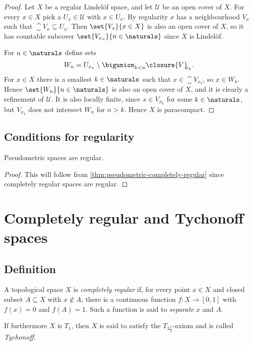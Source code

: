 \documentclass[article, a4paper, 11pt, oneside]{memoir}
\numberwithin{equation}{chapter}
\newcommand{\calU}{\mathcal{U}}
\begin{document}
\begin{proof}
    Let $X$ be a regular Lindelöf space, and let $\calU$ be an open cover of $X$. For every $x \in X$ pick a $U_x \in \calU$ with $x \in U_x$. By regularity $x$ has a neighbourhood $V_x$ such that $\closure{V}_{\!\!x} \subseteq U_x$. Then $\set{V_x}{x \in X}$ is also an open cover of $X$, so it has countable subcover $\set{V_{x_n}}{n \in \naturals}$ since $X$ is Lindelöf.

    For $n \in \naturals$ define sets
    \begin{equation*}
        W_n = U_{x_n} \setminus \bigunion_{k < n} \closure{V}_{\!\!x_k}.
    \end{equation*}
    For $x \in X$ there is a smallest $k \in \naturals$ such that $x \in \closure{V}_{\!\!x_k}$, so $x \in W_k$. Hence $\set{W_n}{n \in \naturals}$ is also an open cover of $X$, and it is clearly a refinement of $\calU$. It is also locally finite, since $x \in V_{x_k}$ for some $k \in \naturals$, but $V_{x_k}$ does not intersect $W_n$ for $n > k$. Hence $X$ is paracompact.
\end{proof}


\section{Conditions for regularity}

\begin{corollary}
    Pseudometric spaces are regular.
\end{corollary}

\begin{proof}
    This will follow from \cref{thm:pseudometric-completely-regular} since completely regular spaces are regular.
\end{proof}



\chapter{Completely regular and Tychonoff spaces}

\section{Definition}

\begin{definition}
    A topological space $X$ is \emph{completely regular} if, for every point $x \in X$ and closed subset $A \subseteq X$ with $x \not\in A$, there is a continuous function $f \colon X \to [0,1]$ with $f(x) = 0$ and $f(A) = 1$. Such a function is said to \emph{separate} $x$ and $A$.

    If furthermore $X$ is $T_1$, then $X$ is said to satisfy the $T_{3\frac{1}{2}}$-axiom and is called \emph{Tychonoff}.
\end{definition}
\end{document}
